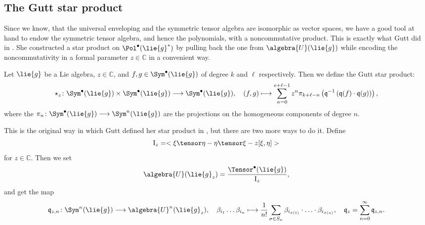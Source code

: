 \subsection{The Gutt star product}
Since we know, that the universal enveloping and the symmetric tensor algebra 
are isomorphic as vector spaces, we have a good tool at hand to endow the 
symmetric tensor algebra, and hence the polynomials, with a noncommutative 
product. This is exactly what Gutt did in \cite{gutt:1983a}. She constructed a 
star product on $\Pol^{\bullet}(\lie{g}^*)$ by pulling back the one from 
$\algebra{U}(\lie{g})$ while encoding the noncommutativity in a formal 
parameter $z \in \mathbb{C}$ in a convenient way. 
\begin{definition}
	\label{Def:GuttStar}
	Let $\lie{g}$ be a Lie algebra, $z \in \mathbb{C}$, and 
	$f, g \in \Sym^{\bullet}(\lie{g})$ of degree $k$ and $\ell$ respectively. 
	Then we define the Gutt star product:
	\begin{equation}
		\star_z
		\colon
		\Sym^{\bullet}(\lie{g})
		\times
		\Sym^{\bullet}(\lie{g})
		\longrightarrow
		\Sym^{\bullet}(\lie{g})
		, \quad
		(f,g)
		\longmapsto
		\sum\limits_{n = 0}^{e + \ell - 1}
		z^n
		\pi_{k + \ell - n}
		\left(
			\mathfrak{q}^{-1} \left(
				\mathfrak{q}(f) \cdot \mathfrak{q}(g)
			\right)
		\right),
	\end{equation}
	where the $\pi_n \colon \Sym^{\bullet}(\lie{g}) \longrightarrow 
	\Sym^n(\lie{g})$ are the projections on the homogeneous components of 
	degree $n$. 
\end{definition}
This is the original way in which Gutt defined her star product in 
\cite{gutt:1983a}, but there are two more ways to do it. Define
\begin{equation*}
	\mathrm{I}_z
	=
	< \xi \tensor \eta - \eta \tensor \xi - z [\xi, \eta] >
\end{equation*}
for $z \in \mathbb{C}$. Then we set 
\begin{equation}
	\label{Alg:DeformedUnivEnvAlg}
	\algebra{U}(\lie{g}_z)
	=
	\frac{\Tensor^{\bullet}(\lie{g})}{\mathrm{I}_z},
\end{equation}
and get the map
\begin{equation}
	\label{Alg:DeformedQuantization}
	\mathfrak{q}_{z,n}
	\colon
	\Sym^n(\lie{g})
	\longrightarrow
	\algebra{U}^n(\lie{g}_z)
	, \quad
	\beta_{i_1} \ldots \beta_{i_n}
	\longmapsto
	\frac{1}{n!}
	\sum\limits_{\sigma \in S_n}
	\beta_{i_{\sigma(1)}} 
	\cdot \ldots \cdot
	\beta_{i_{\sigma(n)}}
	, \quad
	\mathfrak{q}_z
	=
	\sum\limits_{n = 0}^{\infty}
	\mathfrak{q}_{z, n}.
\end{equation}
